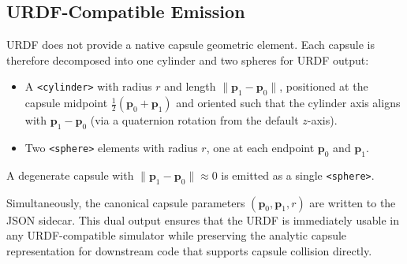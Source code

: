 \subsection{URDF-Compatible Emission}

URDF does not provide a native capsule geometric element.
Each capsule is therefore decomposed into one cylinder and two spheres for URDF output:
\begin{itemize}
    \item A \texttt{<cylinder>} with radius $r$ and length $\|\mathbf{p}_1 - \mathbf{p}_0\|$, positioned at the capsule midpoint $\frac{1}{2}(\mathbf{p}_0 + \mathbf{p}_1)$ and oriented such that the cylinder axis aligns with $\mathbf{p}_1 - \mathbf{p}_0$ (via a quaternion rotation from the default $z$-axis).
    \item Two \texttt{<sphere>} elements with radius $r$, one at each endpoint $\mathbf{p}_0$ and $\mathbf{p}_1$.
\end{itemize}
A degenerate capsule with $\|\mathbf{p}_1 - \mathbf{p}_0\| \approx 0$ is emitted as a single \texttt{<sphere>}.

Simultaneously, the canonical capsule parameters $(\mathbf{p}_0, \mathbf{p}_1, r)$ are written to the JSON sidecar.
This dual output ensures that the URDF is immediately usable in any URDF-compatible simulator while preserving the analytic capsule representation for downstream code that supports capsule collision directly.
